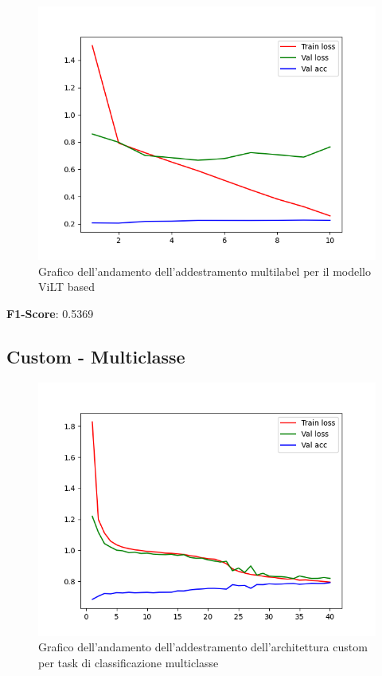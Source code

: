 \documentclass[../main.tex]{subfiles}
\begin{document}
\begin{figure}[H]
    \centering
    \includegraphics[width=1\linewidth]{static//vilt-multilabel/run.png}
    \caption{Grafico dell'andamento dell'addestramento multilabel per il modello ViLT based}
    \label{fig:enter-label}
\end{figure}

\textbf{F1-Score}: 0.5369

\subsection{Custom - Multiclasse}

\begin{figure}[H]
    \centering
    \includegraphics[width=1\linewidth]{static//custom-multiclass/run.png}
    \caption{Grafico dell'andamento dell'addestramento dell'architettura custom per task di classificazione multiclasse}
    \label{fig:enter-label}
\end{figure}
\end{document}
